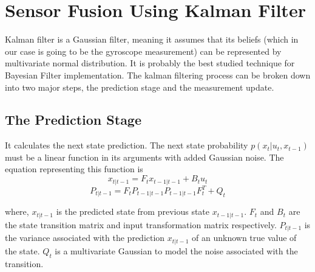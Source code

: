 \documentclass[journal,twoside]{IEEEtran}
\begin{document}
\section{Sensor Fusion Using Kalman Filter}
\noindent Kalman filter is a Gaussian filter, meaning it assumes that its beliefs (which in our case is going to be the gyroscope measurement) can be represented by multivariate normal distribution. It is probably the best studied technique for Bayesian Filter implementation. The kalman filtering process can be broken down into two major steps, the prediction stage and the measurement update.
\subsection{The Prediction Stage}
\noindent It calculates the next state prediction. The next state probability $p(x_t|u_t, x_{t-1})$ must be a linear function in its arguments with added Gaussian noise. The equation representing this function is
\begin{equation}
x_{t|t-1} = F_t x_{t-1|t-1} + B_t u_t
\end{equation} 
\begin{equation}
P_{t|t-1} = F_t P_{t-1|t−1} P_{t-1|t-1} F_t^T + Q_t
\end{equation} 
\par\noindent where,\newline
$x_{t|t-1}$ is the predicted state from previous state $x_{t-1|t-1}$.\newline
$F_t$ and $B_t$ are the state transition matrix and input transformation matrix respectively.\newline
$P_{t|t-1}$ is the variance associated with the prediction $x_{t|t-1}$ of an unknown true value of the state.\newline
$Q_t$ is a multivariate Gaussian to model the noise associated with the transition.\newline
\end{document}
